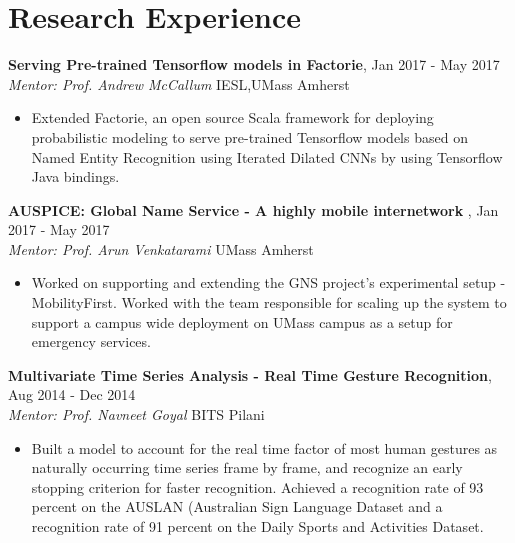 \documentclass[letterpaper]{article}
\begin{document}
\section*{Research Experience}
\textbf{Serving Pre-trained Tensorflow models in Factorie},  \hfill
Jan 2017 - May 2017
\\ \emph{Mentor: Prof. Andrew McCallum} \hfill
IESL,UMass Amherst\\
\vspace{-7mm}
\begin{itemize}
\item Extended Factorie, an open source Scala framework for deploying probabilistic modeling to serve pre-trained Tensorflow models based on Named Entity Recognition using Iterated Dilated CNNs by using Tensorflow Java bindings.
\vspace{-2mm}
\end{itemize}
\vspace{1mm} 
\textbf{AUSPICE: Global Name Service - A highly mobile internetwork },  \hfill
Jan 2017 - May 2017
\\ \emph{Mentor: Prof. Arun Venkatarami} \hfill
UMass Amherst\\
\vspace{-7mm}
\begin{itemize}
\item Worked on supporting and extending the GNS project's experimental setup - MobilityFirst. Worked with the team responsible for scaling up the system to support a campus wide deployment on UMass campus as a setup for emergency services.
\end{itemize}
\vspace{-1mm} 
\textbf{Multivariate Time Series Analysis - Real Time Gesture Recognition},  \hfill
Aug 2014 - Dec 2014
\\ \emph{Mentor: Prof. Navneet Goyal} \hfill
BITS Pilani\\
\vspace{-7mm}
\begin{itemize}
\item Built a model to account for the real time factor of most human gestures as naturally occurring time series frame by frame, and recognize an early stopping criterion for faster recognition. Achieved a recognition rate of 93 percent on the AUSLAN (Australian Sign Language Dataset and a recognition rate of 91 percent on the Daily Sports and Activities Dataset.
\end{itemize}
\end{document}
